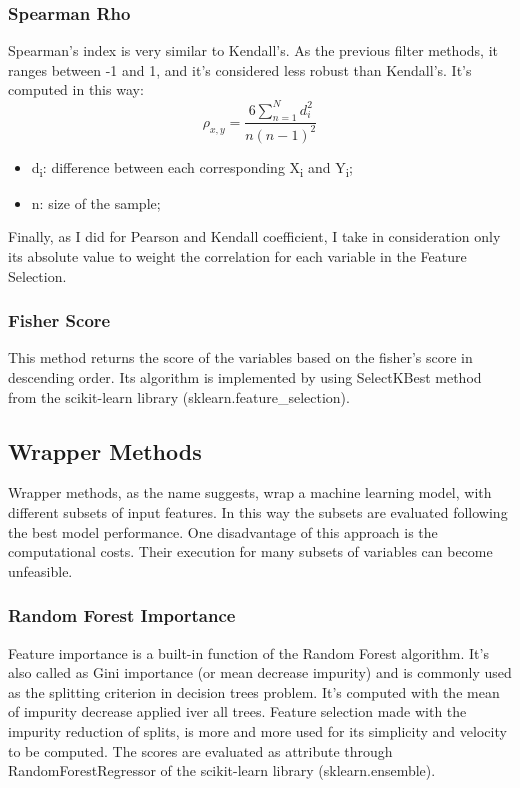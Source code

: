 \subsubsection{Spearman Rho}
Spearman’s index is very similar to Kendall’s. As the previous filter methods, it ranges between -1 and 1, and it's considered less robust than Kendall's.
It's computed in this way:
\begin{equation}
\rho_{x,y} = \frac{6\sum_{n=1}^{N} d_i^2}{n(n-1)^2}
\end{equation}
\begin{itemize}
\item d\textsubscript{i}: difference between each corresponding X\textsubscript{i} and Y\textsubscript{i};
\item n: size of the sample;
\end{itemize}

Finally, as I did for Pearson and Kendall coefficient, I take in consideration only its absolute value to weight the correlation for each variable in the Feature Selection.

\subsubsection{Fisher Score}
This method returns the score of the variables based on the fisher’s score in descending order. \newline
Its algorithm is implemented by using SelectKBest method from the scikit-learn library (sklearn.feature\_selection).
\pagebreak
\subsection{Wrapper Methods}
Wrapper methods, as the name suggests, wrap a machine learning model, with different subsets of input features. In this way the subsets are evaluated following the best model performance.
One disadvantage of this approach is the computational costs.\newline
Their execution for many subsets of variables can become unfeasible. 
\bigbreak
\subsubsection{Random Forest Importance}
Feature importance is a built-in function of the Random Forest algorithm. It's also called as Gini importance (or mean decrease impurity) and is commonly used as the splitting criterion in decision trees problem. 
It's computed with the mean of impurity decrease applied iver all trees.  
Feature selection made with the impurity reduction of splits, is more and more used for its simplicity and velocity to be computed.
The scores are evaluated as attribute through RandomForestRegressor of the scikit-learn library (sklearn.ensemble).
\bigbreak\bigbreak\bigbreak
